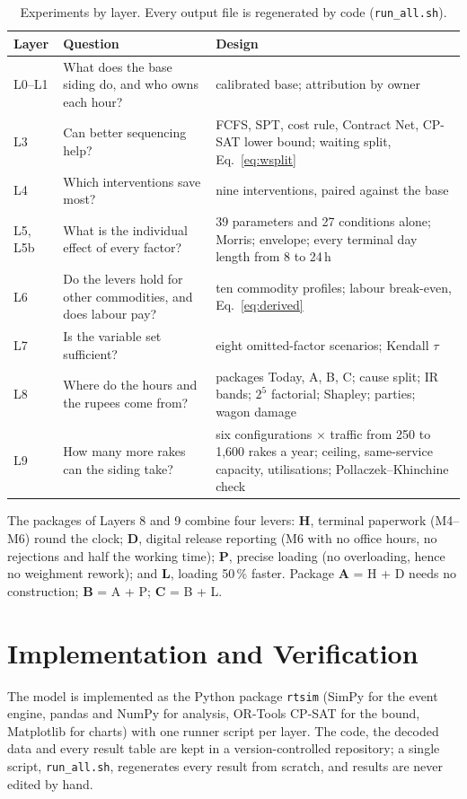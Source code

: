 \begin{table}[!htbp]
\centering
\caption[Experiments by layer]{Experiments by layer. Every output file is regenerated by code (\texttt{run\_all.sh}).}
\label{tab:experiments}
\small
\begin{tabularx}{\textwidth}{@{}l X X@{}}
\toprule
\textbf{Layer} & \textbf{Question} & \textbf{Design} \\
\midrule
L0--L1 & What does the base siding do, and who owns each hour? & calibrated base; attribution by owner \\
L3 & Can better sequencing help? & FCFS, SPT, cost rule, Contract Net, CP-SAT lower bound; waiting split, Eq.~\eqref{eq:wsplit} \\
L4 & Which interventions save most? & nine interventions, paired against the base \\
L5, L5b & What is the individual effect of every factor? & 39 parameters and 27 conditions alone; Morris; envelope; every terminal day length from 8 to 24\,h \\
L6 & Do the levers hold for other commodities, and does labour pay? & ten commodity profiles; labour break-even, Eq.~\eqref{eq:derived} \\
L7 & Is the variable set sufficient? & eight omitted-factor scenarios; Kendall $\tau$ \\
L8 & Where do the hours and the rupees come from? & packages Today, A, B, C; cause split; IR bands; $2^5$ factorial; Shapley; parties; wagon damage \\
L9 & How many more rakes can the siding take? & six configurations $\times$ traffic from 250 to 1,600 rakes a year; ceiling, same-service capacity, utilisations; Pollaczek--Khinchine check \\
\bottomrule
\end{tabularx}
\end{table}

The packages of Layers 8 and 9 combine four levers: \textbf{H}, terminal paperwork (M4--M6) round the clock; \textbf{D}, digital release reporting (M6 with no office hours, no rejections and half the working time); \textbf{P}, precise loading (no overloading, hence no weighment rework); and \textbf{L}, loading 50\,\% faster. Package \textbf{A} = H + D needs no construction; \textbf{B} = A + P; \textbf{C} = B + L.

\section{Implementation and Verification}
\label{sec:impl}
The model is implemented as the Python package \texttt{rtsim} (SimPy for the event engine, pandas and NumPy for analysis, OR-Tools CP-SAT for the bound, Matplotlib for charts) with one runner script per layer. The code, the decoded data and every result table are kept in a version-controlled repository; a single script, \texttt{run\_all.sh}, regenerates every result from scratch, and results are never edited by hand.

